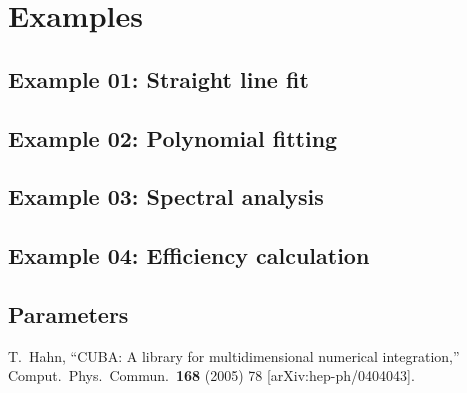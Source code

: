 \documentclass[11pt, a4paper]{article}
\begin{document}
\section{Examples}


\subsection{Example 01: Straight line fit} 


\subsection{Example 02: Polynomial fitting} 


\subsection{Example 03: Spectral analysis} 


\subsection{Example 04: Efficiency calculation} 


\begin{appendix}

\section{Parameters} 

\end{appendix} 


%
\begin{thebibliography}{99}
  T.~Hahn, ``CUBA: A library for multidimensional numerical
  integration,'' Comput.\ Phys.\ Commun.\ {\bf 168} (2005) 78
  [arXiv:hep-ph/0404043].
\end{thebibliography}
\end{document}
